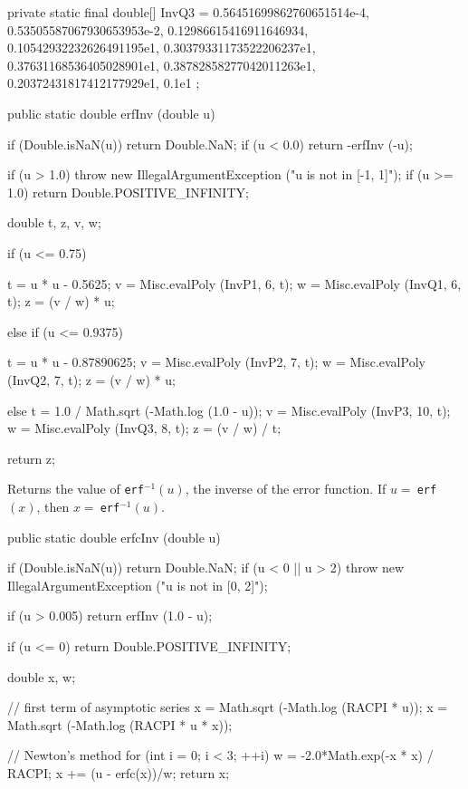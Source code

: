 \begin{code}
\begin{hide}
    private static final double[] InvQ3 = {
        0.56451699862760651514e-4,
        0.53505587067930653953e-2,
        0.12986615416911646934,
        0.10542932232626491195e1,
        0.30379331173522206237e1,
        0.37631168536405028901e1,
        0.38782858277042011263e1,
        0.20372431817412177929e1,
        0.1e1
    };\end{hide}

   public static double erfInv (double u) \begin{hide} {
      if (Double.isNaN(u))
         return Double.NaN;
      if (u < 0.0)
         return -erfInv (-u);

      if (u > 1.0)
         throw new IllegalArgumentException ("u is not in [-1, 1]");
      if (u >= 1.0)
         return Double.POSITIVE_INFINITY;

      double t, z, v, w;

      if (u <= 0.75) {
         t = u * u - 0.5625;
         v = Misc.evalPoly (InvP1, 6, t);
         w = Misc.evalPoly (InvQ1, 6, t);
         z = (v / w) * u;

      } else if (u <= 0.9375) {
         t = u * u - 0.87890625;
         v = Misc.evalPoly (InvP2, 7, t);
         w = Misc.evalPoly (InvQ2, 7, t);
         z = (v / w) * u;

      } else {
         t = 1.0 / Math.sqrt (-Math.log (1.0 - u));
         v = Misc.evalPoly (InvP3, 10, t);
         w = Misc.evalPoly (InvQ3, 8, t);
         z = (v / w) / t;
      }

      return z;
   }\end{hide}
\end{code}
\begin{tabb}
Returns the value of \texttt{erf}${}^{-1}(u)$, the inverse of the error
function. If $u =\ $\texttt{erf}$(x)$, then $x =\ $\texttt{erf}${}^{-1}(u)$.
\end{tabb}
\begin{htmlonly}
\end{htmlonly}
\begin{code}

   public static double erfcInv (double u)\begin{hide} {
      if (Double.isNaN(u))
         return Double.NaN;
      if (u < 0 || u > 2)
         throw new IllegalArgumentException ("u is not in [0, 2]");

      if (u > 0.005)
         return erfInv (1.0 - u);

      if (u <= 0)
         return Double.POSITIVE_INFINITY;

      double x, w;

      // first term of asymptotic series
      x = Math.sqrt (-Math.log (RACPI * u));
      x = Math.sqrt (-Math.log (RACPI * u * x));

      // Newton's method
      for (int i = 0; i < 3; ++i) {
         w = -2.0*Math.exp(-x * x) / RACPI;
         x += (u - erfc(x))/w;
      }
      return x;
   }\end{hide}
\end{code}
